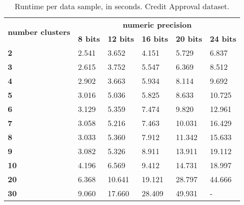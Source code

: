 \begin{table}[H]
\centering
\caption{Runtime per data sample, in seconds. Credit Approval dataset.}
\label{table:runtimeKMCA}
\begin{tabular}{|l|l|l|l|l|l|}
\hline
\multirow{2}{*}{\textbf{number clusters}} & \multicolumn{5}{c}{\textbf{numeric precision}}                                              \\ \cline{2-6}
                                          & \textbf{8 bits} & \textbf{12 bits} & \textbf{16 bits} & \textbf{20 bits} & \textbf{24 bits} \\ \hline
\textbf{2}                                & 2.541           & 3.652            & 4.151            & 5.729            & 6.837            \\ \hline
\textbf{3}                                & 2.615           & 3.752            & 5.547            & 6.369            & 8.512            \\ \hline
\textbf{4}                                & 2.902           & 3.663            & 5.934            & 8.114            & 9.692            \\ \hline
\textbf{5}                                & 3.016           & 5.036            & 5.825            & 8.633            & 10.725           \\ \hline
\textbf{6}                                & 3.129           & 5.359            & 7.474            & 9.820            & 12.961           \\ \hline
\textbf{7}                                & 3.058           & 5.216            & 7.463            & 10.031           & 16.429           \\ \hline
\textbf{8}                                & 3.033           & 5.360            & 7.912            & 11.342           & 15.633           \\ \hline
\textbf{9}                                & 3.082           & 5.326            & 8.911            & 13.911           & 19.112           \\ \hline
\textbf{10}                               & 4.196           & 6.569            & 9.412            & 14.731           & 18.997           \\ \hline
\textbf{20}                               & 6.368           & 10.641           & 19.121           & 28.797           & 44.666           \\ \hline
\textbf{30}                               & 9.060           & 17.660           & 28.409           & 49.931           & -                \\ \hline

\end{tabular}
\end{table}
